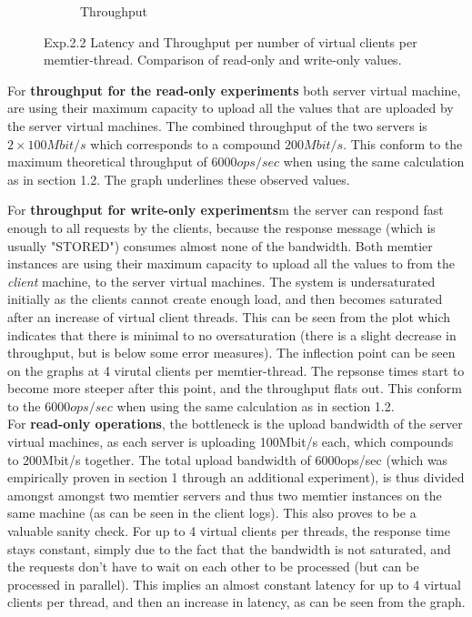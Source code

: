 \documentclass[11pt,a4paper]{article}
\begin{document}
\begin{figure}[H]
\begin{subfigure}{.5\textwidth}
    \caption{Throughput}
    \label{fig:mesh1}
\end{subfigure}
\caption{Exp.2.2 Latency and Throughput per number of virtual clients per memtier-thread. Comparison of read-only and write-only values.}
\label{fig:test}
\end{figure}

For  \textbf{throughput for the read-only experiments} both server virtual machine, are using their maximum capacity to upload all the values that are uploaded by the server virtual machines.
The combined throughput of the two servers is $2 \times 100Mbit/s$ which corresponds to a compound $200Mbit/s$.
This conform to the maximum theoretical throughput of $6000ops/sec$ when using the same calculation as in section 1.2.
The graph underlines these observed values.

For \textbf{throughput for write-only experiments}m the server can respond fast enough to all requests by the clients, because the response message (which is usually "STORED") consumes almost none of the bandwidth. 
Both memtier instances are using their maximum capacity to upload all the values to from the \textit{client} machine, to the server virtual machines.
The system is undersaturated initially as the clients cannot create enough load, and then becomes saturated after an increase of virtual client threads.
This can be seen from the plot which indicates that there is minimal to no oversaturation (there is a slight decrease in throughput, but is below some error measures).
The inflection point can be seen on the graphs at 4 virutal clients per memtier-thread.
The repsonse times start to become more steeper after this point, and the throughput flats out.
This conform to the $6000ops/sec$ when using the same calculation as in section 1.2.\\
For \textbf{read-only operations}, the bottleneck is the upload bandwidth of the server virtual machines, as each server is uploading 100Mbit/s each, which compounds to 200Mbit/s together.
The total upload bandwidth of 6000ops/sec (which was empirically proven in section 1 through an additional experiment), is thus divided amongst amongst two memtier servers and thus two memtier instances on the same machine (as can be seen in the client logs).
This also proves to be a valuable sanity check.
For up to 4 virtual clients per threads, the response time stays constant, simply due to the fact that the bandwidth is not saturated, and the requests don't have to wait on each other to be processed (but can be processed in parallel).
This implies an almost constant latency for up to 4 virtual clients per thread, and then an increase in latency, as can be seen from the graph. \\
\end{document}

